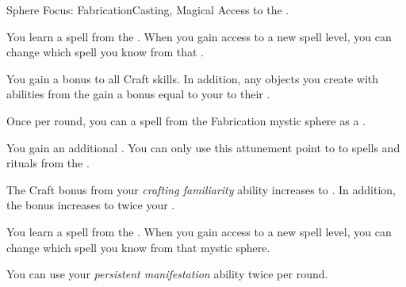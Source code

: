     \begin{feat}{Sphere Focus: Fabrication}{Casting, Magical}
        \featpre Access to the  .

         You learn a spell from the  .
        When you gain access to a new spell level, you can change which spell you know from that .

         You gain a  bonus to all Craft skills.
        In addition, any objects you create with abilities from the   gain a bonus equal to your  to their .

         Once per round, you can  a spell from the Fabrication mystic sphere as a .

         You gain an additional .
        You can only use this attunement point to  to spells and rituals from the  .

         The Craft bonus from your \textit{crafting familiarity} ability increases to .
        In addition, the  bonus increases to twice your .

         You learn a spell from the  .
        When you gain access to a new spell level, you can change which spell you know from that mystic sphere.

         You can use your \textit{persistent manifestation} ability twice per round.
    \end{feat}

